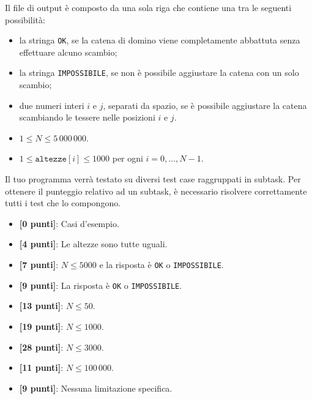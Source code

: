 Il file di output è composto da una sola riga che contiene una tra le seguenti possibilità:
\begin{itemize}[nolistsep,itemsep=2mm]
\item la stringa \texttt{OK}, se la catena di domino viene completamente abbattuta senza effettuare alcuno scambio;
\item la stringa \texttt{IMPOSSIBILE}, se non è possibile aggiustare la catena con un solo scambio;
\item due numeri interi $i$ e $j$, separati da spazio,
  se è possibile aggiustare la catena scambiando le tessere nelle posizioni $i$ e $j$.
\end{itemize}


\pagebreak
\Constraints

\begin{itemize}[nolistsep, itemsep=2mm]
	\item $1 \le N \le 5\,000\,000$.
	\item $1 \le \texttt{altezze}[i] \le 1000$ per ogni $i=0, \ldots, N-1$.
\end{itemize}



\Scoring

Il tuo programma verrà testato su diversi test case raggruppati in subtask.
Per ottenere il punteggio relativo ad un subtask, è necessario risolvere correttamente tutti i test che lo compongono.

\begin{itemize}[nolistsep,itemsep=2mm]
  \item \textbf{ [\phantom{0}0 punti]}: Casi d'esempio.
  \item \textbf{ [\phantom{0}4 punti]}: Le altezze sono tutte uguali.
  \item \textbf{ [\phantom{0}7 punti]}: $N \le 5000$ e la risposta è \texttt{OK} o \texttt{IMPOSSIBILE}.
  \item \textbf{ [\phantom{0}9 punti]}: La risposta è \texttt{OK} o \texttt{IMPOSSIBILE}.
  \item \textbf{ [13 punti]}: $N \leq 50$.
  \item \textbf{ [19 punti]}: $N \leq 1000$.
  \item \textbf{ [28 punti]}: $N \leq 3000$.
  \item \textbf{ [11 punti]}: $N \leq 100\,000$.
  \item \textbf{ [\phantom{0}9 punti]}: Nessuna limitazione specifica.
\end{itemize}

